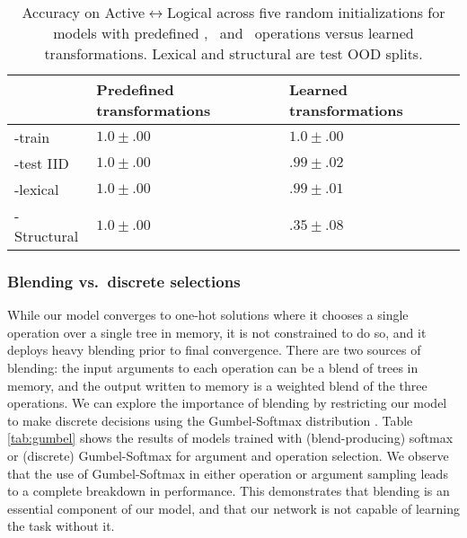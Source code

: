 \begin{table}[t]
\begin{center}
\begin{sc}
\begin{tabular}{lp{8em}p{8em}}
\toprule
& Predefined \mbox{transformations} &  Learned \mbox{transformations} \\
\midrule
-train & $1.0 \pm .00$ & $1.0 \pm .00$ \\
-test IID & $1.0 \pm .00$ &  $.99 \pm .02$ \\
-lexical & $1.0 \pm .00$ & $.99 \pm .01$ \\
-Structural & $1.0 \pm .00$ & $.35 \pm .08$ \\
\bottomrule
\end{tabular}
\end{sc}
\end{center}
\vskip -0.1in
\caption{Accuracy on Active$\leftrightarrow$Logical across five random initializations for models with predefined \car, \cdr\ and \cons\ operations versus learned transformations. Lexical and structural are test OOD splits.}
\label{tab:predefined}
\end{table}

\subsubsection{Blending vs.\ discrete selections}
While our model converges to one-hot solutions where it chooses a single operation over a single tree in memory, it is not constrained to do so, and it deploys heavy blending prior to final convergence. There are two sources of blending: the input arguments to each operation can be a blend of trees in memory, and the output written to memory is a weighted blend of the three operations. We can explore the importance of blending by restricting our model to make discrete decisions using the Gumbel-Softmax distribution \citep{jang2017categorical,maddison2017the}. Table \ref{tab:gumbel} shows the results of models trained with (blend-producing) softmax or (discrete) Gumbel-Softmax for argument and operation selection. We observe that the use of Gumbel-Softmax in either operation or argument sampling leads to a complete breakdown in performance. This demonstrates that blending is an essential component of our model, and that our network is not capable of learning the task without it.

